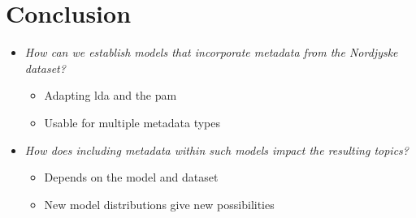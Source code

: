\section{Conclusion}
\begin{frame}{\insertsection}{}
	\begin{itemize}
		\item \textit{How can we establish models that incorporate metadata from the Nordjyske dataset?}
		\begin{itemize}
			\item<2-> Adapting \gls{lda} and the \gls{pam}
			\item<2-> Usable for multiple metadata types
		\end{itemize}
	\vspace{.2cm}
		\item \textit{How does including metadata within such models impact the resulting topics?}
		\begin{itemize}
			\item<3-> Depends on the model and dataset
			\item<3-> New model distributions give new possibilities
		\end{itemize}
	\end{itemize}
\end{frame}